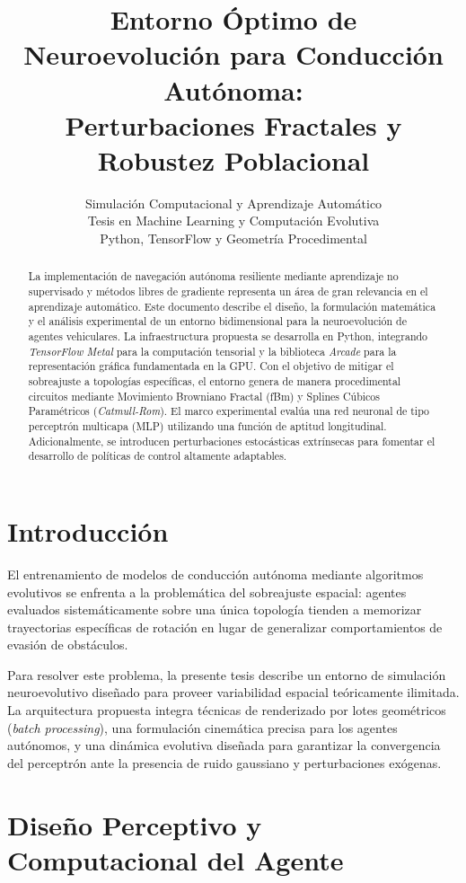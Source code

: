 \documentclass[10pt,twocolumn,letterpaper]{article}
\title{\textbf{Entorno Óptimo de Neuroevolución para Conducción Autónoma: \\ Perturbaciones Fractales y Robustez Poblacional}}
\author{Simulación Computacional y Aprendizaje Automático \\ Tesis en Machine Learning y Computación Evolutiva \\ Python, TensorFlow y Geometría Procedimental}
\date{\vspace{-5ex}}
\begin{document}
\maketitle

\begin{abstract}
La implementación de navegación autónoma resiliente mediante aprendizaje no supervisado y métodos libres de gradiente representa un área de gran relevancia en el aprendizaje automático. Este documento describe el diseño, la formulación matemática y el análisis experimental de un entorno bidimensional para la neuroevolución de agentes vehiculares. La infraestructura propuesta se desarrolla en Python, integrando \textit{TensorFlow Metal} para la computación tensorial y la biblioteca \textit{Arcade} para la representación gráfica fundamentada en la GPU. Con el objetivo de mitigar el sobreajuste a topologías específicas, el entorno genera de manera procedimental circuitos mediante Movimiento Browniano Fractal (fBm) y Splines Cúbicos Paramétricos (\textit{Catmull-Rom}). El marco experimental evalúa una red neuronal de tipo perceptrón multicapa (MLP) utilizando una función de aptitud longitudinal. Adicionalmente, se introducen perturbaciones estocásticas extrínsecas para fomentar el desarrollo de políticas de control altamente adaptables.
\end{abstract}

\section{Introducción}
El entrenamiento de modelos de conducción autónoma mediante algoritmos evolutivos se enfrenta a la problemática del sobreajuste espacial: agentes evaluados sistemáticamente sobre una única topología tienden a memorizar trayectorias específicas de rotación en lugar de generalizar comportamientos de evasión de obstáculos.

Para resolver este problema, la presente tesis describe un entorno de simulación neuroevolutivo diseñado para proveer variabilidad espacial teóricamente ilimitada. La arquitectura propuesta integra técnicas de renderizado por lotes geométricos (\textit{batch processing}), una formulación cinemática precisa para los agentes autónomos, y una dinámica evolutiva diseñada para garantizar la convergencia del perceptrón ante la presencia de ruido gaussiano y perturbaciones exógenas.

\section{Diseño Perceptivo y Computacional del Agente}
\end{document}
